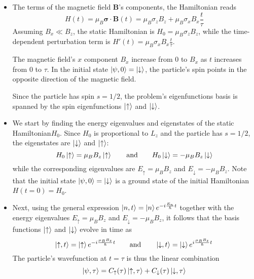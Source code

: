 \documentclass[11pt, a4paper]{article}
\newcommand{\eqtext}[1]{\qquad \text{#1} \qquad}
\newcommand{\Ham}{Hamiltonian\xspace}
\renewcommand{\vec}[1]{\bm{#1}} %
\newcommand{\p}{\psi}  %
\newcommand{\ua}{\uparrow}  %
\newcommand{\da}{\downarrow}  %
\begin{document}
\begin{itemize}

	\item The terms of the magnetic field $ \vec{B} $'s components, the \Ham reads
	\begin{equation*}
		H(t) = \mu_{B}\vec{\sigma}\cdot \vec{B}(t) = \mu_{B}\sigma_{z}B_{z} + \mu_{B}\sigma_{x}B_{x}\frac{t}{\tau}
	\end{equation*}
	Assuming $ B_{x} \ll B_{z} $, the static \Ham is $ H_{0} = \mu_{B}\sigma_{z}B_{z} $, while the time-dependent perturbation term is $ H'(t) = \mu_{B}\sigma_{x}B_{x}\frac{t}{\tau} $.
	
	The magnetic field's $ x $ component $ B_{x} $ increase from $ 0 $ to $ B_{x} $ as $ t $ increases from $ 0  $ to $ \tau $. In the initial state $ \ket{\p, 0} = \ket{\da} $, the particle's spin points in the opposite direction of the magnetic field. 
	
	Since the particle has spin $ s = 1/2 $, the problem's eigenfunctions basis is spanned by the spin eigenfunctions $ \ket{\ua} $ and $ \ket{\da} $.


	\item We start by finding the energy eigenvalues and eigenstates of the static \Ham $ H_{0} $. Since $ H_{0} $ is proportional to $ L_{z} $ and the particle has $ s = 1/2 $, the eigenstates are $ \ket{\da} $ and $ \ket{\ua} $:
	\begin{equation*}
		H_{0}\ket{\ua} = \mu_{B}B_{z} \ket{\ua} \eqtext{and} H_{0}\ket{\da} = -\mu_{B}B_{z} \ket{\da} 
	\end{equation*}
	while the corresponding eigenvalues are $ E_{\ua} = \mu_{B}B_{z} $ and $ E_{\da} = -\mu_{B}B_{z} $. Note that the initial state $ \ket{\p, 0} = \ket{\da} $ is a ground state of the initial Hamiltonian $ H(t = 0) = H_{0} $. 
	
	\item Next, using the general expression $ \ket{n, t} = \ket{n} e^{-i\frac{E_{n}}{\hbar}t} $ together with the energy eigenvalues $ E_{\ua} = \mu_{B}B_{z} $ and $ E_{\da} = -\mu_{B}B_{z} $, it follows that the basis functions $ \ket{\ua} $ and $ \ket{\da} $ evolve in time as
	\begin{equation*}
		\ket{\ua, t} = \ket{\ua} e^{-i\frac{\mu_{B}B_{z}}{\hbar}t} \eqtext{and} \ket{\da, t} = \ket{\da} e^{i\frac{\mu_{B}B_{z}}{\hbar}t}
	\end{equation*}
	The particle's wavefunction at $ t = \tau $ is thus the linear combination
	\begin{equation*}
		\ket{\p, \tau} = C_{\ua}(\tau) \ket{\ua, \tau} +  C_{\da}(\tau) \ket{\da, \tau} 
	\end{equation*}
	

\end{itemize}
\end{document}
